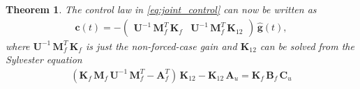 \documentclass[journal]{IEEEtran}
\newtheorem{theorem}{Theorem}[section]
\begin{document}
\begin{theorem} \label{the:control}
The control law in \eqref{eq:joint_control} can now be written as
%
\begin{equation} 
\begin{split}
  \mathbf{c}(t) = - \begin{pmatrix}
    \mathbf{U}^{-1} \, \mathbf{M}_f^T \, \mathbf{K}_{f} &
    \mathbf{U}^{-1} \, \mathbf{M}_f^T \, \mathbf{K}_{12}
  \end{pmatrix} \, \hat{\mathbf{g}}(t),
\end{split}
\label{eq:joint_control2}
\end{equation}
%
where $\mathbf{U}^{-1} \, \mathbf{M}_f^T \, \mathbf{K}_{f}$ is just the non-forced-case gain and $\mathbf{K}_{12}$ can be solved from the Sylvester equation
%
\begin{equation}
\begin{split}
  \left( \mathbf{K}_{f} \, \mathbf{M}_f \, \mathbf{U}^{-1} \, \mathbf{M}_f^T 
         - \mathbf{A}_f^T \right) \, \mathbf{K}_{12}  - \mathbf{K}_{12} \, \mathbf{A}_u
    = \mathbf{K}_{f} \, \mathbf{B}_f \, \mathbf{C}_u \\
\end{split}
\end{equation}
%
\end{theorem}
\end{document}
